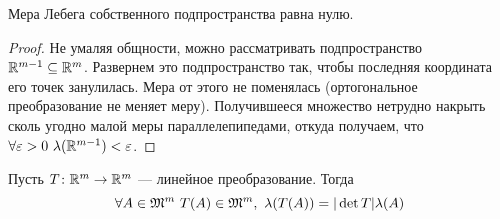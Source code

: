 \begin{lemma}
	Мера Лебега собственного подпространства равна нулю.
\end{lemma}
\begin{proof}
	Не умаляя общности, можно рассматривать подпространство \\ $\mathbb{R}^{m - 1} \subseteq \mathbb{R}^m$.
	Развернем это подпространство так, чтобы последняя координата его точек занулилась.
	Мера от этого не поменялась (ортогональное преобразование не меняет меру). Получившееся
	множество нетрудно накрыть сколь угодно малой меры параллелепипедами, откуда получаем,
	что $\forall \varepsilon > 0~ \lambda(\mathbb{R}^{m - 1}) < \varepsilon$.
\end{proof}

\begin{theorem}
	Пусть $T \colon \mathbb{R}^m \to \mathbb{R}^m$ --- линейное преобразование. Тогда
\[
	\forall A \in \mathfrak{M}^m~ T(A) \in \mathfrak{M}^m,~ \lambda(T(A)) = |\det{T}| \lambda(A)
\]

\end{theorem}

\let\x\undefined
\let\y\undefined
\let\h\undefined
\let\w\undefined
\let\z\undefined
\let\Od\undefined
\let\N\undefined
\let\C\undefined
